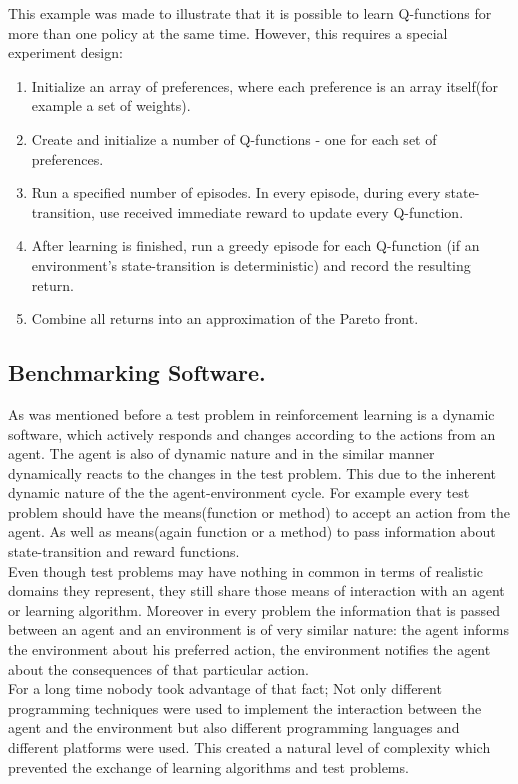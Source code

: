 {{This example was made to illustrate that it is possible to learn Q-functions for more than one policy at the same time. However, this requires a special experiment design:
\begin{enumerate}
  \item Initialize an array of preferences, where each preference is an array itself(for example a set of weights). 
  \item Create and initialize a number of Q-functions - one for each set of preferences.
  \item Run a specified number of episodes. In every episode, during every state-transition, use received immediate reward to update every Q-function. 
  \item After learning is finished, run a greedy episode for each Q-function (if an environment's state-transition is deterministic) and record the resulting return. 
  \item Combine all returns into an approximation of the Pareto front.
\end{enumerate}

\subsection{Benchmarking Software.}
As was mentioned before a test problem in reinforcement learning is a dynamic software, which actively responds and changes according to the actions from an agent. The agent is also of dynamic nature and in the similar manner dynamically reacts to the changes in the test problem. This due to the inherent dynamic nature of the the agent-environment cycle. For example every test problem should have the means(function or method) to accept an action from the agent. As well as means(again function or a method) to pass information about state-transition and reward functions. \\

Even though test problems may have nothing in common in terms of realistic domains they represent, they still share those means of interaction with an agent or learning algorithm. Moreover in every problem the information that is passed between an agent and an environment is of very similar nature: the agent informs the environment about his preferred action, the environment notifies the agent about the consequences of that particular action. \\

For a long time nobody took advantage of that fact; Not only different programming techniques were used to implement the interaction between the agent and the environment but also different programming languages and different platforms were used. This created a natural level of complexity which prevented the exchange of learning algorithms and test problems. \\

}}
